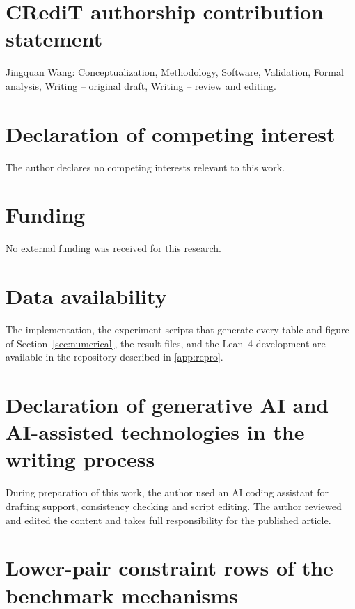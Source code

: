 \section*{CRediT authorship contribution statement}

Jingquan Wang: Conceptualization, Methodology, Software, Validation, Formal analysis, Writing --
original draft, Writing -- review and editing.

\section*{Declaration of competing interest}

The author declares no competing interests relevant to this work.

\section*{Funding}

No external funding was received for this research.

\section*{Data availability}

The implementation, the experiment scripts that generate every table and figure of
Section~\ref{sec:numerical}, the result files, and the Lean~4 development are available in the
repository described in \ref{app:repro}.

\section*{Declaration of generative AI and AI-assisted technologies in the writing process}

During preparation of this work, the author used an AI coding assistant for drafting support,
consistency checking and script editing. The author reviewed and edited the content and takes full
responsibility for the published article.

\appendix

\section{Lower-pair constraint rows of the benchmark mechanisms}
\label{app:lower-pair}

